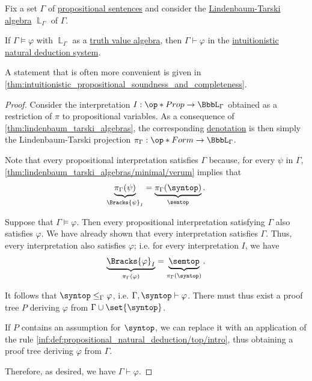 \begin{theorem}\label{thm:intuitionistic_propositional_completeness}
  Fix a set \( \Gamma \) of \hyperref[def:propositional_formula]{propositional sentences} and consider the \hyperref[def:lindenbaum_tarski_algebra]{Lindenbaum-Tarski algebra} \( \BbbL_\Gamma \) of \( \Gamma \).

  If \( \Gamma \vDash \varphi \) with \( \BbbL_\Gamma \) as a \hyperref[def:truth_value_algebra]{truth value algebra}, then \( \Gamma \vdash \varphi \) in the \hyperref[def:propositional_natural_deduction]{intuitionistic natural deduction system}.
\end{theorem}
\begin{comments}
  \item A statement that is often more convenient is given in \cref{thm:intuitionistic_propositional_soundness_and_completeness}.
\end{comments}
\begin{proof}
  Consider the interpretation \( I: \op*{Prop} \to \BbbL_\Gamma \) obtained as a restriction of \( \pi \) to propositional variables. As a consequence of \cref{thm:lindenbaum_tarski_algebras}, the corresponding \hyperref[alg:propositional_denotation]{denotation} is then simply the Lindenbaum-Tarski projection \( \pi_\Gamma: \op*{Form} \to \BbbL_\Gamma \).

  Note that every propositional interpretation satisfies \( \Gamma \) because, for every \( \psi \) in \( \Gamma \), \cref{thm:lindenbaum_tarski_algebras/minimal/verum} implies that
  \begin{equation*}
    \underbrace{\pi_\Gamma(\psi)}_{\Bracks{\psi}_I} = \underbrace{\pi_\Gamma(\syntop)}_{\semtop}.
  \end{equation*}

  Suppose that \( \Gamma \vDash \varphi \). Then every propositional interpretation satisfying \( \Gamma \) also satisfies \( \varphi \). We have already shown that every interpretation satisfies \( \Gamma \). Thus, every interpretation also satisfies \( \varphi \); i.e. for every interpretation \( I \), we have
  \begin{equation*}
    \underbrace{\Bracks{\varphi}_I}_{\pi_\Gamma(\varphi)} = \underbrace{\semtop}_{\pi_\Gamma(\syntop)}.
  \end{equation*}

  It follows that \( \syntop \leq_\Gamma \varphi \), i.e. \( \Gamma, \syntop \vdash \varphi \). There must thus exist a proof tree \( P \) deriving \( \varphi \) from \( \Gamma \cup \set{ \syntop } \).

  If \( P \) contains an assumption for \( \syntop \), we can replace it with an application of the rule \ref{inf:def:propositional_natural_deduction/top/intro}, thus obtaining a proof tree deriving \( \varphi \) from \( \Gamma \).

  Therefore, as desired, we have \( \Gamma \vdash \varphi \).
\end{proof}

